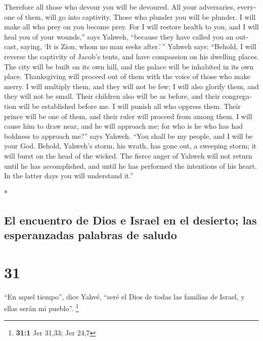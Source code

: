 \begin{paracol}{2}
\begin{otherlanguage}{english}
 Therefore all those who devour you will be devoured. All
your adversaries, everyone of them, will go into captivity. Those who
plunder you will be plunder. I will make all who prey on you become
prey.  For I will restore health to you, and I will heal
you of your wounds,'' says Yahweh, ``because they have called you an
outcast, saying, `It is Zion, whom no man seeks after.'\,''
 Yahweh says: ``Behold, I will reverse the captivity of
Jacob's tents, and have compassion on his dwelling places. The city will
be built on its own hill, and the palace will be inhabited in its own
place.  Thanksgiving will proceed out of them with the
voice of those who make merry. I will multiply them, and they will not
be few; I will also glorify them, and they will not be small.
 Their children also will be as before, and their
congregation will be established before me. I will punish all who
oppress them.  Their prince will be one of them, and
their ruler will proceed from among them. I will cause him to draw near,
and he will approach me; for who is he who has had boldness to approach
me?'' says Yahweh.  ``You shall be my people, and I will
be your God.  Behold, Yahweh's storm, his wrath, has gone
out, a sweeping storm; it will burst on the head of the wicked.
 The fierce anger of Yahweh will not return until he has
accomplished, and until he has performed the intentions of his heart. In
the latter days you will understand it.''

\end{otherlanguage}

\switchcolumn[0]*

\hypertarget{el-encuentro-de-dios-e-israel-en-el-desierto-las-esperanzadas-palabras-de-saludo}{%
\subsection{El encuentro de Dios e Israel en el desierto; las
esperanzadas palabras de
saludo}\label{el-encuentro-de-dios-e-israel-en-el-desierto-las-esperanzadas-palabras-de-saludo}}

\hypertarget{section-60}{%
\section{31}\label{section-60}}

 ``En aquel tiempo'', dice Yahvé, ``seré el Dios de todas
las familias de Israel, y ellas serán mi pueblo''. \footnote{\textbf{31:1}
  Jer 31,33; Jer 24,7}


\end{paracol}
